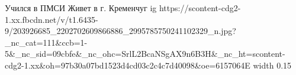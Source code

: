  
 
 
 
 

\par
Учился в ПМСИ
Живет в г. Кременчуг
\ifcmt
  ig https://scontent-cdg2-1.xx.fbcdn.net/v/t1.6435-9/203926685_2202702609866886_2995785750241102329_n.jpg?_nc_cat=111&ccb=1-5&_nc_sid=09cbfe&_nc_ohc=SrlL2BcaNSgAX9n6B3H&_nc_ht=scontent-cdg2-1.xx&oh=97b30a07bd1523d4cd03c2c4c7d40098&oe=6157064E
  width 0.15
\fi

